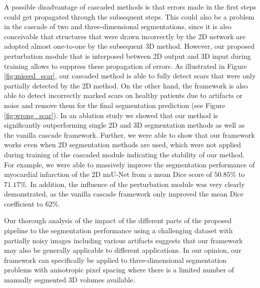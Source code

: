 \documentclass[preprint,5p,authoryear]{elsarticle}
\begin{document}
A possible disadvantage of cascaded methods is that errors made in the first steps could get propagated through the subsequent steps. This could also be a problem in the cascade of two and three-dimensional segmentations, since it is also conceivable that structures that were drawn incorrectly by the 2D network are adopted almost one-to-one by the subsequent 3D method. However, our proposed perturbation module that is interposed between 2D output and 3D input during training allows to suppress these propagation of errors. As illustrated in Figure \ref{fig:missed_scar}, our cascaded method is able to fully detect scars that were only partially detected by the 2D method. On the other hand, the framework is also able to detect incorrectly marked scars on healthy patients due to artifacts or noise and remove them for the final segmentation prediction (see Figure \ref{fig:wrong_scar}). In an ablation study we showed that our method is significantly outperforming single 2D and 3D segmentation methods as well as the vanilla cascade framework. Further, we were able to show that our framework works even when 2D segmentation methods are used, which were not applied during training of the cascaded module indicating the stability of our method. For example, we were able to massively improve the segmentation performance of myocardial infarction of the 2D nnU-Net from a mean Dice score of $50.85 \%$ to $71.17 \%$. In addition, the influence of the perturbation module was very clearly demonstrated, as the vanilla cascade framework only improved the mean Dice coefficient to $62\%$.     

Our thorough analysis of the impact of the different parts of the proposed pipeline to the segmentation performance using a challenging dataset with partially noisy images including various artifacts suggests that our framework may also be generally applicable to different applications. In our opinion, our framework can specifically be applied to three-dimensional segmentation problems with anisotropic pixel spacing where there is a limited number of manually segmented 3D volumes available. 
\end{document}

